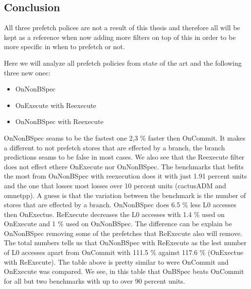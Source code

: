 \subsection{Conclusion}
All three prefetch polices are not a result of this thesis and therefore all will be kept as  a reference when now adding more filters on top of this in order to be more specific in when to prefetch or not.

Here we will analyze all prefetch policies from state of the art \fixme and the following three new onec:
\begin{itemize}
	\item OnNonBSpec
	\item OnExecute with Reexecute
	\item OnNonBSpec with Reexecute
\end{itemize}
\resExtime
{}
OnNonBSpec seams to be the fastest one 2,3 \% faster then OnCommit. It makes a different to not prefetch stores that are effected by a branch, the branch predictions seams to be false in most cases. We also see that the Reexecute filter does not effect ethere OnExecute nor OnNonBSpec.
The benchmarks that befits the most from OnNonBSpec with reexecution does it with just 1.91 percent units and the one that losses most losses over 10 percent units (cactusADM and omnetpp). A guess is that the variation between the benchmark is the number of stores that are effected by a branch.
\resAcc
{}
OnNonBSpec does 6.5 \% less L0 accesses then OnExectue. ReExecute decreases the L0 accesses with 1.4 \% used on OnExecute and 1 \% used on OnNonBSpec. The difference can be explain be OnNonBSpec removing some of the prefetches that ReExecute also will remove. The total numbers tells us that OnNonBSpec with ReExecute as the lest number of L0 accesses apart from OnCommit with 111.5 \% against 117.6 \% (OnExectue with ReExecute). 
The table above is pretty similar to \fixme were OnCommit and OnExecute was compared. We see, in this table that OnBSpec beats OnCommit for all but two benchmarks with up to over 90 percent units. 
